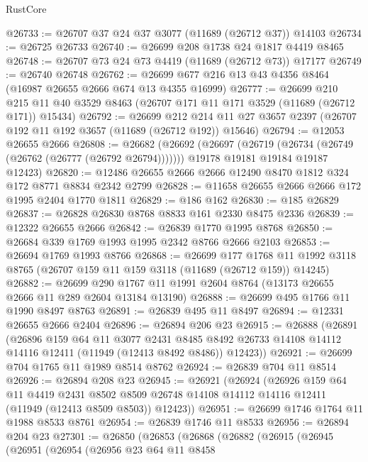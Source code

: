 \begin{lexlean}{RustCore}
\begin{coremodule}
@26733 := @26707 @37 @24 @37 @3077 (@11689 (@26712 @37)) @14103
@26734 := @26725 @26733
@26740 := @26699 @208 @1738 @24 @1817 @4419 @8465
@26748 := @26707 @73 @24 @73 @4419 (@11689 (@26712 @73)) @17177
@26749 := @26740 @26748
@26762 := @26699 @677 @216 @13 @43 @4356 @8464 (@16987 @26655 @2666 @674 @13 @4355 @16999)
@26777 := @26699
    @210
    @215
    @11
    @40
    @3529
    @8463
    (@26707 @171 @11 @171 @3529 (@11689 (@26712 @171)) @15434)
@26792 := @26699
    @212
    @214
    @11
    @27
    @3657
    @2397
    (@26707 @192 @11 @192 @3657 (@11689 (@26712 @192)) @15646)
@26794 := @12053 @26655 @2666
@26808 := @26682
    (@26692
      (@26697 (@26719 (@26734 (@26749 (@26762 (@26777 (@26792 @26794)))))))
      @19178
      @19181
      @19184
      @19187
      @12423)
@26820 := @12486 @26655 @2666 @2666 @12490 @8470 @1812 @324 @172 @8771 @8834 @2342 @2799
@26828 := @11658 @26655 @2666 @2666 @172 @1995 @2404 @1770 @1811
@26829 := @186 @162
@26830 := @185 @26829
@26837 := @26828 @26830 @8768 @8833 @161 @2330 @8475 @2336
@26839 := @12322 @26655 @2666
@26842 := @26839 @1770 @1995 @8768
@26850 := @26684 @339 @1769 @1993 @1995 @2342 @8766 @2666 @2103
@26853 := @26694 @1769 @1993 @8766
@26868 := @26699
    @177
    @1768
    @11
    @1992
    @3118
    @8765
    (@26707 @159 @11 @159 @3118 (@11689 (@26712 @159)) @14245)
@26882 := @26699 @290 @1767 @11 @1991 @2604 @8764 (@13173 @26655 @2666 @11 @289 @2604 @13184 @13190)
@26888 := @26699 @495 @1766 @11 @1990 @8497 @8763
@26891 := @26839 @495 @11 @8497
@26894 := @12331 @26655 @2666 @2404
@26896 := @26894 @206 @23
@26915 := @26888
    (@26891
      (@26896
        @159
        @64
        @11
        @3077
        @2431
        @8485
        @8492
        @26733
        @14108
        @14112
        @14116
        @12411
        (@11949 (@12413 @8492 @8486))
        @12423))
@26921 := @26699 @704 @1765 @11 @1989 @8514 @8762
@26924 := @26839 @704 @11 @8514
@26926 := @26894 @208 @23
@26945 := @26921
    (@26924
      (@26926
        @159
        @64
        @11
        @4419
        @2431
        @8502
        @8509
        @26748
        @14108
        @14112
        @14116
        @12411
        (@11949 (@12413 @8509 @8503))
        @12423))
@26951 := @26699 @1746 @1764 @11 @1988 @8533 @8761
@26954 := @26839 @1746 @11 @8533
@26956 := @26894 @204 @23
@27301 := @26850
    (@26853
      (@26868
        (@26882
          (@26915
            (@26945
              (@26951
                (@26954
                  (@26956
                    @23
                    @64
                    @11
                    @8458

\end{coremodule}
\end{lexlean}
